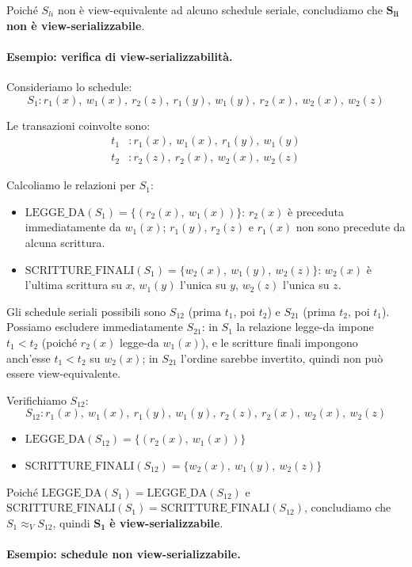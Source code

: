 Poiché $S_{li}$ non è view-equivalente ad alcuno schedule seriale, concludiamo che $\mathbf{S_{li}}$ \textbf{non è view-serializzabile}.
\paragraph{Esempio: verifica di view-serializzabilità.}

Consideriamo lo schedule:
\[
S_1 : r_1(x),\ w_1(x),\ r_2(z),\ r_1(y),\ w_1(y),\ r_2(x),\ w_2(x),\ w_2(z)
\]

Le transazioni coinvolte sono:
\begin{align*}
	t_1 &: r_1(x),\ w_1(x),\ r_1(y),\ w_1(y) \\
	t_2 &: r_2(z),\ r_2(x),\ w_2(x),\ w_2(z)
\end{align*}

Calcoliamo le relazioni per $S_1$:
\begin{itemize}
	\item $\text{LEGGE\_DA}(S_1) = \{(r_2(x),\ w_1(x))\}$: $r_2(x)$ è preceduta immediatamente da $w_1(x)$; $r_1(y)$, $r_2(z)$ e $r_1(x)$ non sono precedute da alcuna scrittura.
	\item $\text{SCRITTURE\_FINALI}(S_1) = \{w_2(x),\ w_1(y),\ w_2(z)\}$: $w_2(x)$ è l'ultima scrittura su $x$, $w_1(y)$ l'unica su $y$, $w_2(z)$ l'unica su $z$.
\end{itemize}

Gli schedule seriali possibili sono $S_{12}$ (prima $t_1$, poi $t_2$) e $S_{21}$ (prima $t_2$, poi $t_1$). Possiamo escludere immediatamente $S_{21}$: in $S_1$ la relazione legge-da impone $t_1 < t_2$ (poiché $r_2(x)$ legge-da $w_1(x)$), e le scritture finali impongono anch'esse $t_1 < t_2$ su $w_2(x)$; in $S_{21}$ l'ordine sarebbe invertito, quindi non può essere view-equivalente.

Verifichiamo $S_{12}$:
\[
S_{12} : r_1(x),\ w_1(x),\ r_1(y),\ w_1(y),\ r_2(z),\ r_2(x),\ w_2(x),\ w_2(z)
\]
\begin{itemize}
	\item $\text{LEGGE\_DA}(S_{12}) = \{(r_2(x),\ w_1(x))\}$
	\item $\text{SCRITTURE\_FINALI}(S_{12}) = \{w_2(x),\ w_1(y),\ w_2(z)\}$
\end{itemize}

Poiché $\text{LEGGE\_DA}(S_1) = \text{LEGGE\_DA}(S_{12})$ e $\text{SCRITTURE\_FINALI}(S_1) = \text{SCRITTURE\_FINALI}(S_{12})$, concludiamo che $S_1 \approx_V S_{12}$, quindi $\mathbf{S_1}$ \textbf{è view-serializzabile}.
\paragraph{Esempio: schedule non view-serializzabile.}

